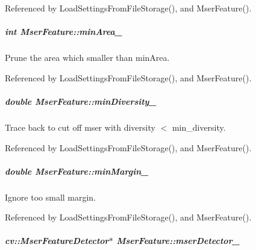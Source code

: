 Referenced by Load\-Settings\-From\-File\-Storage(), and Mser\-Feature().

\hypertarget{group___feature_extractor_a556156bf90c6cff20f7451134dc5c9f3}{
\subparagraph[{min\-Area\-\_\-}]{\setlength{\rightskip}{0pt plus 5cm}int Mser\-Feature\-::min\-Area\-\_\-\hspace{0.3cm}{\ttfamily [private]}}}\label{group___feature_extractor_a556156bf90c6cff20f7451134dc5c9f3}


Prune the area which smaller than min\-Area. 



Referenced by Load\-Settings\-From\-File\-Storage(), and Mser\-Feature().

\hypertarget{group___feature_extractor_a7f7fe51c62b96bcc83f51e73e0d59a94}{
\subparagraph[{min\-Diversity\-\_\-}]{\setlength{\rightskip}{0pt plus 5cm}double Mser\-Feature\-::min\-Diversity\-\_\-\hspace{0.3cm}{\ttfamily [private]}}}\label{group___feature_extractor_a7f7fe51c62b96bcc83f51e73e0d59a94}


Trace back to cut off mser with diversity $<$ min\-\_\-diversity. 



Referenced by Load\-Settings\-From\-File\-Storage(), and Mser\-Feature().

\hypertarget{group___feature_extractor_a6bc22c26631b87ff8787244da9d1eca2}{
\subparagraph[{min\-Margin\-\_\-}]{\setlength{\rightskip}{0pt plus 5cm}double Mser\-Feature\-::min\-Margin\-\_\-\hspace{0.3cm}{\ttfamily [private]}}}\label{group___feature_extractor_a6bc22c26631b87ff8787244da9d1eca2}


Ignore too small margin. 



Referenced by Load\-Settings\-From\-File\-Storage(), and Mser\-Feature().

\hypertarget{group___feature_extractor_a4e7332139a72f3591cbc2e02e7f67748}{
\subparagraph[{mser\-Detector\-\_\-}]{\setlength{\rightskip}{0pt plus 5cm}cv\-::\-Mser\-Feature\-Detector$\ast$ Mser\-Feature\-::mser\-Detector\-\_\-\hspace{0.3cm}{\ttfamily [private]}}}\label{group___feature_extractor_a4e7332139a72f3591cbc2e02e7f67748}


